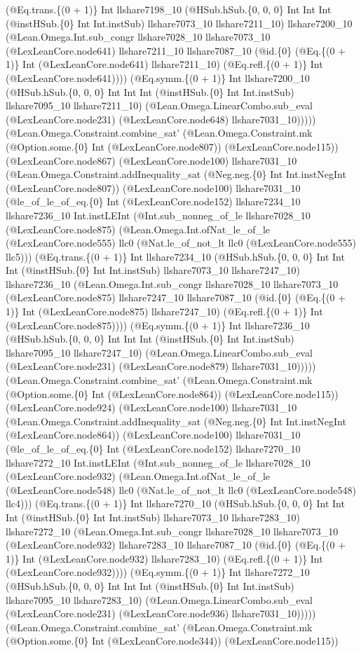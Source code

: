 \documentclass[11pt]{article}
\begin{document}
(@Eq.trans.\{(0 + 1)\} Int llshare7198\_10 (@HSub.hSub.\{0, 0, 0\} Int Int Int (@instHSub.\{0\} Int Int.instSub) llshare7073\_10 llshare7211\_10) llshare7200\_10 (@Lean.Omega.Int.sub\_congr llshare7028\_10 llshare7073\_10 (@LexLeanCore.node641) llshare7211\_10 llshare7087\_10 (@id.\{0\} (@Eq.\{(0 + 1)\} Int (@LexLeanCore.node641) llshare7211\_10) (@Eq.refl.\{(0 + 1)\} Int (@LexLeanCore.node641)))) (@Eq.symm.\{(0 + 1)\} Int llshare7200\_10 (@HSub.hSub.\{0, 0, 0\} Int Int Int (@instHSub.\{0\} Int Int.instSub) llshare7095\_10 llshare7211\_10) (@Lean.Omega.LinearCombo.sub\_eval (@LexLeanCore.node231) (@LexLeanCore.node648) llshare7031\_10))))) (@Lean.Omega.Constraint.combine\_sat' (@Lean.Omega.Constraint.mk (@Option.some.\{0\} Int (@LexLeanCore.node807)) (@LexLeanCore.node115)) (@LexLeanCore.node867) (@LexLeanCore.node100) llshare7031\_10 (@Lean.Omega.Constraint.addInequality\_sat (@Neg.neg.\{0\} Int Int.instNegInt (@LexLeanCore.node807)) (@LexLeanCore.node100) llshare7031\_10 (@le\_of\_le\_of\_eq.\{0\} Int (@LexLeanCore.node152) llshare7234\_10 llshare7236\_10 Int.instLEInt (@Int.sub\_nonneg\_of\_le llshare7028\_10 (@LexLeanCore.node875) (@Lean.Omega.Int.ofNat\_le\_of\_le (@LexLeanCore.node555) llc0 (@Nat.le\_of\_not\_lt llc0 (@LexLeanCore.node555) llc5))) (@Eq.trans.\{(0 + 1)\} Int llshare7234\_10 (@HSub.hSub.\{0, 0, 0\} Int Int Int (@instHSub.\{0\} Int Int.instSub) llshare7073\_10 llshare7247\_10) llshare7236\_10 (@Lean.Omega.Int.sub\_congr llshare7028\_10 llshare7073\_10 (@LexLeanCore.node875) llshare7247\_10 llshare7087\_10 (@id.\{0\} (@Eq.\{(0 + 1)\} Int (@LexLeanCore.node875) llshare7247\_10) (@Eq.refl.\{(0 + 1)\} Int (@LexLeanCore.node875)))) (@Eq.symm.\{(0 + 1)\} Int llshare7236\_10 (@HSub.hSub.\{0, 0, 0\} Int Int Int (@instHSub.\{0\} Int Int.instSub) llshare7095\_10 llshare7247\_10) (@Lean.Omega.LinearCombo.sub\_eval (@LexLeanCore.node231) (@LexLeanCore.node879) llshare7031\_10))))) (@Lean.Omega.Constraint.combine\_sat' (@Lean.Omega.Constraint.mk (@Option.some.\{0\} Int (@LexLeanCore.node864)) (@LexLeanCore.node115)) (@LexLeanCore.node924) (@LexLeanCore.node100) llshare7031\_10 (@Lean.Omega.Constraint.addInequality\_sat (@Neg.neg.\{0\} Int Int.instNegInt (@LexLeanCore.node864)) (@LexLeanCore.node100) llshare7031\_10 (@le\_of\_le\_of\_eq.\{0\} Int (@LexLeanCore.node152) llshare7270\_10 llshare7272\_10 Int.instLEInt (@Int.sub\_nonneg\_of\_le llshare7028\_10 (@LexLeanCore.node932) (@Lean.Omega.Int.ofNat\_le\_of\_le (@LexLeanCore.node548) llc0 (@Nat.le\_of\_not\_lt llc0 (@LexLeanCore.node548) llc4))) (@Eq.trans.\{(0 + 1)\} Int llshare7270\_10 (@HSub.hSub.\{0, 0, 0\} Int Int Int (@instHSub.\{0\} Int Int.instSub) llshare7073\_10 llshare7283\_10) llshare7272\_10 (@Lean.Omega.Int.sub\_congr llshare7028\_10 llshare7073\_10 (@LexLeanCore.node932) llshare7283\_10 llshare7087\_10 (@id.\{0\} (@Eq.\{(0 + 1)\} Int (@LexLeanCore.node932) llshare7283\_10) (@Eq.refl.\{(0 + 1)\} Int (@LexLeanCore.node932)))) (@Eq.symm.\{(0 + 1)\} Int llshare7272\_10 (@HSub.hSub.\{0, 0, 0\} Int Int Int (@instHSub.\{0\} Int Int.instSub) llshare7095\_10 llshare7283\_10) (@Lean.Omega.LinearCombo.sub\_eval (@LexLeanCore.node231) (@LexLeanCore.node936) llshare7031\_10))))) (@Lean.Omega.Constraint.combine\_sat' (@Lean.Omega.Constraint.mk (@Option.some.\{0\} Int (@LexLeanCore.node344)) (@LexLeanCore.node115)) 
\end{document}
